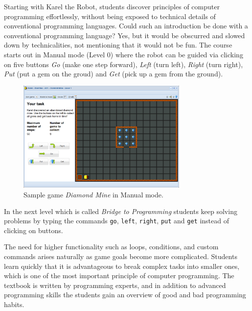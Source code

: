 \documentclass[article,A4,12pt]{llncs}
\begin{document}
Starting with Karel the Robot, students discover principles of computer programming effortlessly,
without being exposed to technical details of conventional programming languages.
Could such an introduction be done with a conventional programming language? Yes, but 
it would be obscurred and slowed down by technicalities, not mentioning that it would 
not be fun. The course starts out in Manual mode (Level 0) where the robot can be guided via 
clicking on five buttons {\em Go} (make one step forward), {\em Left} (turn left), {\em Right} 
(turn right), {\em Put} (put a gem on the groud) and {\em Get} (pick up a gem from the ground). 

\begin{figure}[!ht]
\begin{center}
\includegraphics[width=0.75\textwidth]{imgk/fore-1.png}
\end{center}
\vspace{-2mm}
\caption{Sample game {\em Diamond Mine} in Manual mode.}
\label{fig:f1}
\vspace{-4mm}
\end{figure}
\noindent
In the next level which is called {\em Bridge to Programming} students keep solving 
problems by typing the commands {\tt go}, {\tt left}, {\tt right}, {\tt put} and {\tt get} 
instead of clicking on buttons. 

The need for higher functionality such as loops, conditions, and custom commands arises 
naturally as game goals become more complicated. 
Students learn quickly that it is advantageous to break complex tasks into smaller 
ones, which is one of the most important principle of computer 
programming. The textbook is written by programming experts, and in addition to 
advanced programming skills the students gain an overview of good and bad 
programming habits.
\end{document}
